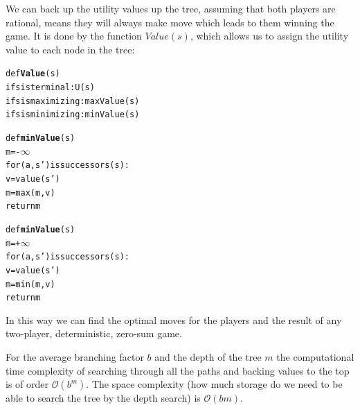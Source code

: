 \documentclass[a4paper,10pt]{article}
\begin{document}
We can back up the utility values up the tree, assuming that both players are rational, means they will always make move which leads to them winning the game. It is done by the function $Value(s)$, which allows us to assign the utility value to each node in the tree:

 \begin{alltt}
def \textbf{Value}(s)
   if s is terminal:     U(s)
   if s is maximizing:   maxValue(s)
   if s is minimizing:   minValue(s)

def \textbf{minValue}(s)
   m = -\(\infty \)
   for (a,s') is successors(s):
      v = value(s')
      m = max(m,v)
   return m
	
def \textbf{minValue}(s)
   m = +\(\infty \)
   for (a,s') is successors(s):
      v = value(s')
	  m = min(m,v)
   return m
\end{alltt}

In this way we can find the optimal moves for the players and the result of any two-player, deterministic, zero-sum game.

For the average branching factor $b$ and the depth of the tree $m$ the computational time complexity of searching through all the paths and backing values to the top is of order $\mathcal{O}(b^m)$. The space complexity (how much storage do we need to be able to search the tree by the depth search) is $\mathcal{O}(bm)$.
\end{document}
